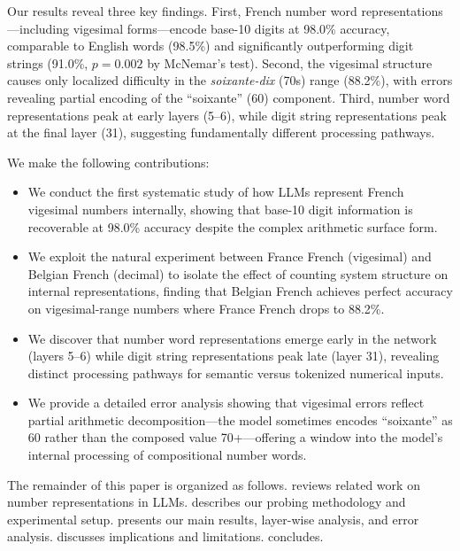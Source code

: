 Our results reveal three key findings. First, French number word representations---including vigesimal forms---encode base-10 digits at 98.0\% accuracy, comparable to English words (98.5\%) and significantly outperforming digit strings (91.0\%, $p=0.002$ by McNemar's test). Second, the vigesimal structure causes only localized difficulty in the \emph{soixante-dix} (70s) range (88.2\%), with errors revealing partial encoding of the ``soixante'' (60) component. Third, number word representations peak at early layers (5--6), while digit string representations peak at the final layer (31), suggesting fundamentally different processing pathways.

We make the following contributions:
\begin{itemize}[leftmargin=*,itemsep=0pt,topsep=0pt]
    \item We conduct the first systematic study of how LLMs represent French vigesimal numbers internally, showing that base-10 digit information is recoverable at 98.0\% accuracy despite the complex arithmetic surface form.
    \item We exploit the natural experiment between France French (vigesimal) and Belgian French (decimal) to isolate the effect of counting system structure on internal representations, finding that Belgian French achieves perfect accuracy on vigesimal-range numbers where France French drops to 88.2\%.
    \item We discover that number word representations emerge early in the network (layers 5--6) while digit string representations peak late (layer 31), revealing distinct processing pathways for semantic versus tokenized numerical inputs.
    \item We provide a detailed error analysis showing that vigesimal errors reflect partial arithmetic decomposition---the model sometimes encodes ``soixante'' as 60 rather than the composed value 70+---offering a window into the model's internal processing of compositional number words.
\end{itemize}

The remainder of this paper is organized as follows.  reviews related work on number representations in LLMs.  describes our probing methodology and experimental setup.  presents our main results, layer-wise analysis, and error analysis.  discusses implications and limitations.  concludes.
